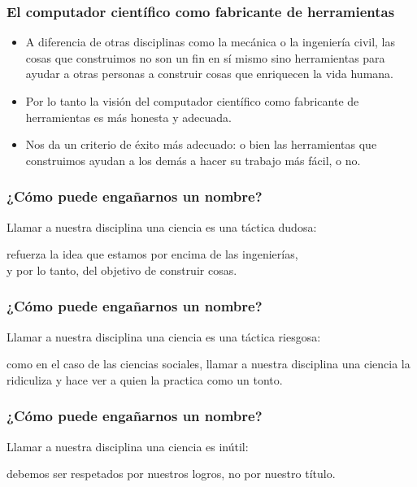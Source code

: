 \documentclass[spanish]{beamer}
\begin{document}
\begin{frame}
  \frametitle{El computador científico como fabricante de herramientas}

  \begin{itemize}
    \item  A diferencia de otras disciplinas como la mecánica o la ingeniería
      civil, las cosas que construimos no son un fin en sí mismo sino
      herramientas para ayudar a otras personas a construir cosas que
      enriquecen la vida humana.

    \pause

    \item Por lo tanto la visión del computador científico como fabricante de
      herramientas es más honesta y adecuada.

    \pause

   \item Nos da un criterio de éxito más adecuado: o bien las herramientas que
     construimos ayudan a los demás a hacer su trabajo más fácil, o no.
  \end{itemize}
\end{frame}

\begin{frame}
  \frametitle{¿Cómo puede engañarnos un nombre?}

  \pause

  \begin{center}
    Llamar a nuestra disciplina una ciencia es una táctica dudosa:

    \pause

    \vspace{2em}
    refuerza la idea que estamos por encima de las ingenierías, \\
    y por lo tanto, del objetivo de construir cosas.
  \end{center}
\end{frame}

\begin{frame}
  \frametitle{¿Cómo puede engañarnos un nombre?}

  \begin{center}
    Llamar a nuestra disciplina una ciencia es una táctica riesgosa:

    \pause

    \vspace{2em}
    como en el caso de las ciencias sociales, llamar a nuestra disciplina una
    ciencia la ridiculiza y hace ver a quien la practica como un tonto.
  \end{center}
\end{frame}

\begin{frame}
  \frametitle{¿Cómo puede engañarnos un nombre?}

  \begin{center}
    Llamar a nuestra disciplina una ciencia es inútil:

    \pause

    \vspace{2em}
    debemos ser respetados por nuestros logros, no por nuestro título.
  \end{center}
\end{frame}
\end{document}
